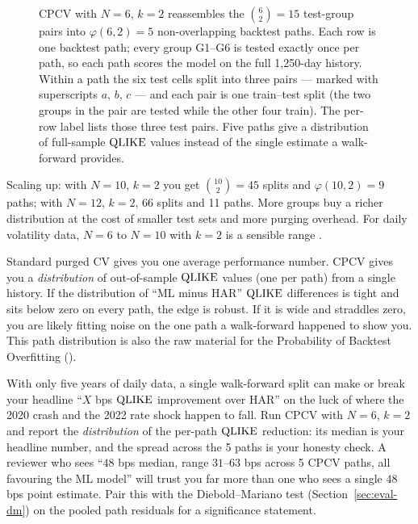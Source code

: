 \begin{figure}[ht]
\caption{CPCV with $N=6$, $k=2$ reassembles the $\binom{6}{2}=15$ test-group pairs into $\varphi(6,2)=5$ non-overlapping backtest paths.
Each row is one backtest path; every group G1--G6 is tested exactly once per path, so each path scores the model on the full 1{,}250-day history.
Within a path the six test cells split into three pairs --- marked with superscripts $a$, $b$, $c$ --- and each pair is one train--test split (the two groups in the pair are tested while the other four train).
The per-row label lists those three test pairs.
Five paths give a distribution of full-sample $\operatorname{QLIKE}$ values instead of the single estimate a walk-forward provides.}
\label{fig:ch16-cpcv-paths}
\end{figure}

Scaling up: with $N=10$, $k=2$ you get $\binom{10}{2}=45$ splits and $\varphi(10,2)=9$ paths; with $N=12$, $k=2$, 66 splits and 11 paths.
More groups buy a richer distribution at the cost of smaller test sets and more purging overhead.
For daily volatility data, $N=6$ to $N=10$ with $k=2$ is a sensible range \citep{LopezdePrado2018}.

\begin{keyidea}
Standard purged CV gives you one average performance number.
CPCV gives you a \emph{distribution} of out-of-sample $\operatorname{QLIKE}$ values (one per path) from a single history.
If the distribution of ``ML minus HAR'' $\operatorname{QLIKE}$ differences is tight and sits below zero on every path, the edge is robust.
If it is wide and straddles zero, you are likely fitting noise on the one path a walk-forward happened to show you.
This path distribution is also the raw material for the Probability of Backtest Overfitting ().
\end{keyidea}

\begin{projectconnection}
With only five years of daily data, a single walk-forward split can make or break your headline ``$X$ bps $\operatorname{QLIKE}$ improvement over HAR'' on the luck of where the 2020 crash and the 2022 rate shock happen to fall.
Run CPCV with $N=6$, $k=2$ and report the \emph{distribution} of the per-path $\operatorname{QLIKE}$ reduction: its median is your headline number, and the spread across the 5 paths is your honesty check.
A reviewer who sees ``$48$ bps median, range $31$--$63$ bps across 5 CPCV paths, all favouring the ML model'' will trust you far more than one who sees a single $48$ bps point estimate.
Pair this with the Diebold--Mariano test (Section~\ref{sec:eval-dm}) on the pooled path residuals for a significance statement.
\end{projectconnection}


